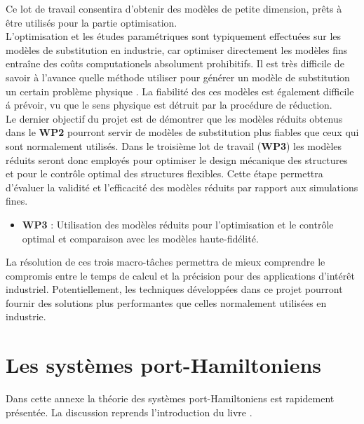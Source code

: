 \documentclass[12pt, french]{article}
\begin{document}
	Ce lot de travail consentira d'obtenir des modèles de petite dimension, prêts à être utilisés pour la partie optimisation.\\ 
	
	L'optimisation et les études paramétriques sont typiquement effectuées sur les
		modèles de substitution en industrie, car optimiser directement les modèles fins entraîne des coûts computationels absolument prohibitifs. Il est très difficile de savoir \`a l'avance quelle méthode utiliser pour générer un modèle de substitution un certain problème physique \cite{lancaster2018}. La fiabilité des ces modèles est également difficile \'a prévoir, vu que le sens physique est détruit par la procédure de réduction. \\
	
	Le dernier objectif du projet est de démontrer que les modèles réduits obtenus dans le \textbf{WP2} pourront servir de modèles de substitution plus fiables que ceux qui sont normalement utilisés. Dans le troisième lot de travail (\textbf{WP3}) les modèles réduits seront donc employés pour optimiser le design mécanique des structures et pour le contrôle optimal des structures flexibles. Cette étape permettra d’évaluer la validité et l’efficacité des modèles réduits par rapport aux simulations fines. \\
	
	\begin{itemize}
		\item \textbf{WP3} : Utilisation des modèles réduits pour l'optimisation et le contrôle optimal et comparaison avec les  modèles haute-fidélité. \\
	\end{itemize}
	
	La résolution de ces trois macro-tâches permettra de mieux comprendre le compromis entre le temps de calcul et la précision pour des applications d'intérêt industriel. Potentiellement, les techniques développées dans ce projet pourront fournir des solutions plus performantes que celles normalement utilisées en industrie. 
	
	
	\appendix
	
	\section{Les systèmes port-Hamiltoniens}\label{sec:pHreview}
	
	Dans cette annexe la théorie des systèmes port-Hamiltoniens est rapidement présentée. La discussion reprends l'introduction du livre \cite{van2014port}. \\
	
\end{document}
